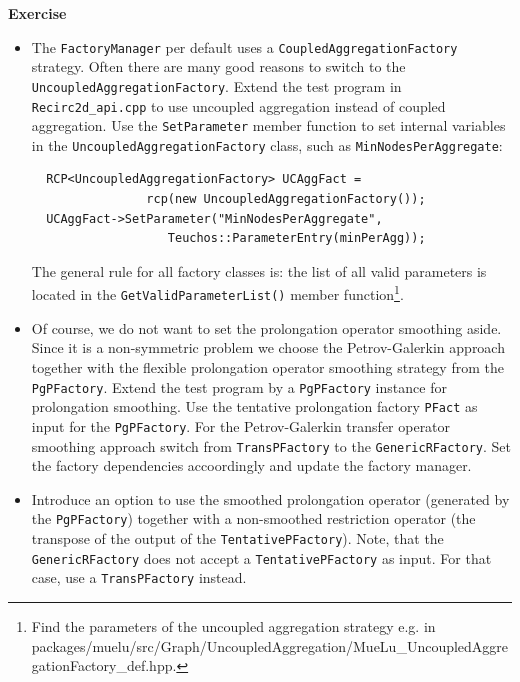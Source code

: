 \documentclass[12pt,a4paper]{article}
\begin{document}
\begin{graybox}
 \textbf{Exercise}
 \begin{itemize}
  \item The \verb|FactoryManager| per default uses a \verb|CoupledAggregationFactory| strategy. Often there are many good reasons to switch to the \verb|UncoupledAggregationFactory|. Extend the test program in \verb|Recirc2d_api.cpp| to use uncoupled aggregation instead of coupled aggregation. Use the \verb|SetParameter| member function to set internal variables in the \verb|UncoupledAggregationFactory| class, such as \verb|MinNodesPerAggregate|:
  \begin{verbatim}
  RCP<UncoupledAggregationFactory> UCAggFact = 
                rcp(new UncoupledAggregationFactory());
  UCAggFact->SetParameter("MinNodesPerAggregate",
                   Teuchos::ParameterEntry(minPerAgg));
  \end{verbatim}
  The general rule for all factory classes is: the list of all valid parameters is located in the \verb|GetValidParameterList()| member function\footnote{Find the parameters of the uncoupled aggregation strategy e.g. in packages/muelu/src/Graph/UncoupledAggregation/MueLu\_UncoupledAggregationFactory\_def.hpp.}.
  \item Of course, we do not want to set the prolongation operator smoothing aside. Since it is a non-symmetric problem we choose the Petrov-Galerkin approach together with the flexible prolongation operator smoothing strategy from the \verb|PgPFactory|. Extend the test program by a \verb|PgPFactory| instance for prolongation smoothing. Use the tentative prolongation factory \verb|PFact| as input for the \verb|PgPFactory|. For the Petrov-Galerkin transfer operator smoothing approach switch from \verb|TransPFactory| to the \verb|GenericRFactory|. Set the factory dependencies accoordingly and update the factory manager.
  \item Introduce an option to use the smoothed prolongation operator (generated by the \verb|PgPFactory|) together with a non-smoothed restriction operator (the transpose of the output of the \verb|TentativePFactory|). Note, that the \verb|GenericRFactory| does not accept a \verb|TentativePFactory| as input. For that case, use a \verb|TransPFactory| instead.
 \end{itemize}
\end{graybox}
\end{document}

